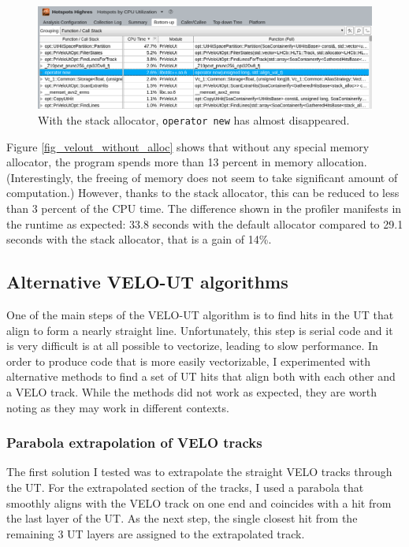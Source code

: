 \documentclass[12pt]{article}
\newcommand{\code}[1]{\texttt{#1}}
\begin{document}
\begin{figure}[H]
	\begin{center}
		\includegraphics[width=\textwidth]{velout_with_alloc}
	\end{center}
	\caption{With the stack allocator, \code{operator new} has almost disappeared.}
	\label{fig_velout_with_alloc}
\end{figure}

Figure \ref{fig_velout_without_alloc} shows that without any special memory allocator, the program spends more than 13 percent in memory allocation. (Interestingly, the freeing of memory does not seem to take significant amount of computation.) However, thanks to the stack allocator, this can be reduced to less than 3 percent of the CPU time. The difference shown in the profiler manifests in the runtime as expected: 33.8 seconds with the default allocator compared to 29.1 seconds with the stack allocator, that is a gain of 14\%.


\subsection{Alternative VELO-UT algorithms}\label{sec_velout_alternative}

One of the main steps of the VELO-UT algorithm is to find hits in the UT that align to form a nearly straight line. Unfortunately, this step is serial code and it is very difficult is at all possible to vectorize, leading to slow performance. In order to produce code that is more easily vectorizable, I experimented with alternative methods to find a set of UT hits that align both with each other and a VELO track. While the methods did not work as expected, they are worth noting as they may work in different contexts.

\subsubsection{Parabola extrapolation of VELO tracks}

The first solution I tested was to extrapolate the straight VELO tracks through the UT. For the extrapolated section of the tracks, I used a parabola that smoothly aligns with the VELO track on one end and coincides with a hit from the last layer of the UT. As the next step, the single closest hit from the remaining 3 UT layers are assigned to the extrapolated track.
\end{document}
